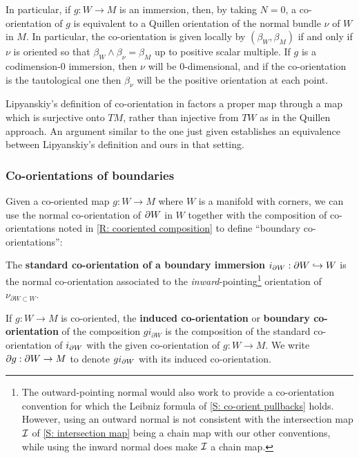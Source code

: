 \begin{remark}\label{R: immersion}
In particular, if $g: W\to M$ is an immersion, then, by taking $N=0$, a co-orientation of $g$ is equivalent to a Quillen orientation of the normal bundle
  $\nu$  of $W$ in $M$. In particular, the co-orientation is given locally by $(\beta_W,\beta_M)$ if and only if $\nu$ is oriented so that $\beta_W\wedge \beta_\nu=
\beta_M$ up to positive scalar multiple. If $g$ is a codimension-$0$ immersion, then $\nu$ will be $0$-dimensional, and if the co-orientation is the tautological one then $\beta_\nu$ will be the positive orientation at each point. 
\end{remark}


\begin{remark}
Lipyanskiy's definition of co-orientation in \cite{Lipy14} factors a proper map through a map which is surjective onto $TM$, 
rather than injective from $TW$ as in the Quillen approach.
An argument similar to the one just given establishes an equivalence between Lipyanskiy's definition and ours in that setting. 
\end{remark}




\subsubsection{Co-orientations of boundaries}
Given a co-oriented map $g:W\to M$ where $W$ is a manifold with corners, we can use the normal co-orientation of $\partial W$ in $W$ together with the composition of co-orientations noted in \cref{R: cooriented composition} to define ``boundary co-orientations'':

\begin{definition}\label{D: boundary co-orientation}
The {\bf standard co-orientation of a boundary immersion}
 $i_{\partial W}:\partial W \hookrightarrow W$ is the normal co-orientation associated to the \textit{inward}-pointing\footnote{The outward-pointing normal would also work to provide a co-orientation convention for which the Leibniz formula of \cref{S: co-orient pullbacks} holds. However, using an outward normal is not consistent with the intersection map $\mathcal{I}$ of \cref{S: intersection map} being a chain map with our other conventions, while using the inward normal does make $\mathcal{I}$ a chain map.}
orientation of $\nu_{\partial W \subset W}$.  

If $g : W \to M$ is co-oriented, the {\bf induced co-orientation} or {\bf boundary co-orientation} of the composition $gi_{\partial W}$ is the composition of the standard co-orientation of $i_{\partial W}$ with the given co-orientation of $g:W\to M$. We write $\partial g:\partial W\to M$ to denote $gi_{\partial W}$ with its induced co-orientation.  
\end{definition}

